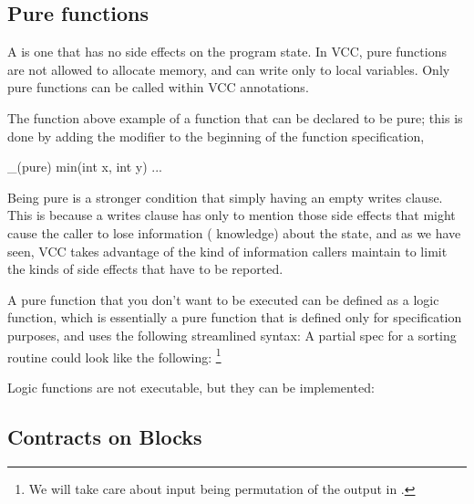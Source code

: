 \subsection{Pure functions}
\label{sect:pureFunctions}
A  is one that has no side effects on the program
state. In VCC, pure functions are not allowed to allocate memory, and can
write only to local variables. Only pure functions can be called within VCC
annotations.

The function  above
example of a function that can be declared to be pure; this is done by
adding the modifier  to the beginning of the function specification,
\eg
\begin{VCC}
_(pure) min(int x, int y) ...
\end{VCC}

Being pure is a stronger condition that simply having an empty writes
clause. This is because a writes clause has only to mention those side
effects that might cause the caller to lose information (\ie
knowledge) about the state, and as we have seen, VCC takes advantage
of the kind of information callers maintain to limit the kinds of side
effects that have to be reported.

A pure function that you don't want to be executed can be defined as a
logic function, which is essentially a pure function that is defined
only for specification purposes, and uses the following streamlined syntax:
\noindent
A partial spec for a sorting routine could look like the following:%
\footnote{We will take care about input being permutation of the output in .}

Logic functions are not executable, but they can be implemented:


\subsection{Contracts on Blocks} 

